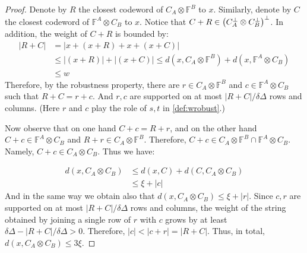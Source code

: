  \begin{proof}
Denote by $R$ the closest codeword of $C_{A}\otimes\mathbb{F}^{B}$ to $x$. Similarly, denote by $C$ the closest codeword of $\mathbb{F}^{A} \otimes C_{B}$ to $x$. Notice that $C + R \in \left( C_{A}^{\perp}\otimes C_{B}^{\perp} \right)^{\perp}$. In addition, the weight of $C+R$ is bounded by:
   \begin{equation*}
     \begin{split}
       |R + C| &=  |x + \left(x + R\right) + x + \left( x + C\right)| \\
       & \le |\left(x + R\right)|+ |\left( x + C\right)| \le d\left( x ,   C_{A}\otimes\mathbb{F}^{B} \right) +  d\left( x ,   \mathbb{F}^{A} \otimes C_{B} \right) \\ 
       & \le w
     \end{split}
   \end{equation*}
   Therefore, by the robustness property, there are $r \in C_{A}\otimes\mathbb{F}^{B}$ and $c \in \mathbb{F}^{A} \otimes C_{B} $ such that $ R + C  = r + c$. And $r,c$ are supported on at most $|R+C|/\delta\Delta$ rows and columns. (Here $r$ and $c$ play the role of $s,t$ in \cref{def:wrobust}.)  

   Now observe that on one hand $C + c = R + r$, and on the other hand $ C + c \in \mathbb{F}^{A} \otimes C_{B} $ and $R+r \in C_{A}\otimes\mathbb{F}^{B}$. Therefore, $C+c \in C_{A}\otimes\mathbb{F}^{B} \cap \mathbb{F}^{A} \otimes C_{B}$. Namely, $C +c \in C_{A} \otimes C_{B}$. Thus we have:  
   
   \begin{equation*}
     \begin{split}
       d\left(x, C_{A}\otimes C_{B}\right) & \le d\left(x, C\right) + d\left(C, C_{A}\otimes C_{B} \right) \\
       &\le \xi + |c|
     \end{split}
   \end{equation*}
   And in the same way we obtain also that $d\left( x, C_{A} \otimes C_{B} \right) \le \xi + |r|$. Since $c,r$ are supported on at most $|R+C|/\delta\Delta$ rows and columns, the weight of the string obtained by joining a single row of $r$ with $c$ grows by at least $\delta\Delta - |R+C|/\delta\Delta > 0$. Therefore, $|c| < |c + r| = |R + C|$. Thus, in total, $d\left( x, C_{A} \otimes C_{B} \right) \le 3\xi$.
 \end{proof}

